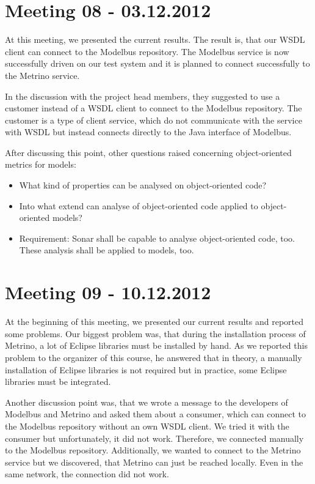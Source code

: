 \section{Meeting 08 - 03.12.2012}
At this meeting, we presented the current results. The result is, that our WSDL client can connect to the Modelbus repository. The Modelbus service is now successfully driven on our test system and it is planned to connect successfully to the Metrino service.

In the discussion with the project head members, they suggested to use a customer instead of a WSDL client to connect to the Modelbus repository. The customer is a type of client service, which do not communicate with the service with WSDL but instead connects directly to the Java interface of Modelbus.

After discussing this point, other questions raised concerning object-oriented metrics for models:

\begin{itemize}
\item What kind of properties can be analysed on object-oriented code?
\item Into what extend can analyse of object-oriented code applied to object-oriented models?
\item Requirement: Sonar shall be capable to analyse object-oriented code, too. These analysis shall be applied to models, too.
\end{itemize}

\section{Meeting 09 - 10.12.2012}
At the beginning of this meeting, we presented our current results and reported some problems. Our biggest problem was, that during the installation process of Metrino, a lot of Eclipse libraries must be installed by hand. As we reported this problem to the organizer of this course, he answered that in theory, a manually installation of Eclipse libraries is not required but in practice, some Eclipse libraries must be integrated.

Another discussion point was, that we wrote a message to the developers of Modelbus and Metrino and asked them about a consumer, which can connect to the Modelbus repository without an own WSDL client. We tried it with the consumer but unfortunately, it did not work. Therefore, we connected manually to the Modelbus repository. Additionally, we wanted to connect to the Metrino service but we discovered, that Metrino can just be reached locally. Even in the same network, the connection did not work.

